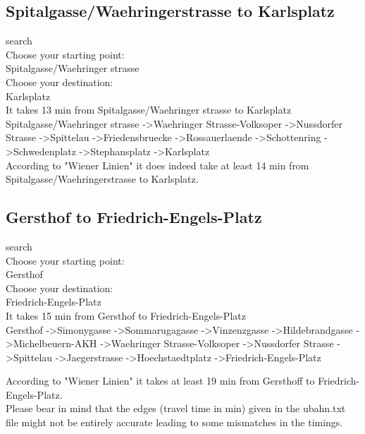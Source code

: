 \documentclass[12pt]{article}
\begin{document}
\subsection{Spitalgasse/Waehringerstrasse to Karlsplatz}
search\\
Choose your starting point:\\ 
Spitalgasse/Waehringer strasse\\
Choose your destination: \\
Karlsplatz\\
It takes 13 min from Spitalgasse/Waehringer strasse to Karlsplatz\\
Spitalgasse/Waehringer strasse -\textgreater Waehringer Strasse-Volksoper -\textgreater Nussdorfer Strasse -\textgreater Spittelau -\textgreater Friedensbruecke -\textgreater Rossauerlaende -\textgreater Schottenring -\textgreater Schwedenplatz -\textgreater Stephansplatz -\textgreater Karlsplatz\\

\noindent According to "Wiener Linien" it does indeed take at least 14 min from Spitalgasse/Waehringerstrasse to Karlsplatz.

\subsection {Gersthof to Friedrich-Engels-Platz}
search\\
Choose your starting point: \\
Gersthof\\
Choose your destination: \\
Friedrich-Engels-Platz\\
It takes 15 min from Gersthof to Friedrich-Engels-Platz\\
Gersthof -\textgreater Simonygasse -\textgreater Sommarugagasse -\textgreater Vinzenzgasse -\textgreater Hildebrandgasse -\textgreater Michelbeuern-AKH -\textgreater Waehringer Strasse-Volksoper -\textgreater Nussdorfer Strasse -\textgreater Spittelau -\textgreater Jaegerstrasse -\textgreater Hoechstaedtplatz -\textgreater Friedrich-Engels-Platz

\noindent According to "Wiener Linien" it takes at least 19 min from Gersthoff to Friedrich-Engels-Platz.\\

\noindent Please bear in mind that the edges (travel time in min) given in the ubahn.txt file might not be entirely accurate leading to some mismatches in the timings. 
\end{document}

